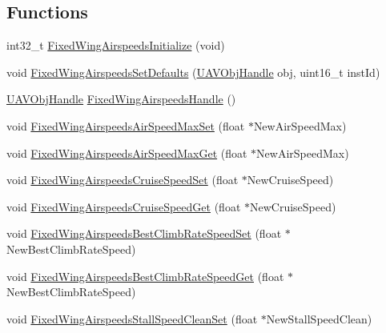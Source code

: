 \subsection*{\-Functions}
\begin{DoxyCompactItemize}
\item 
int32\-\_\-t \hyperlink{group___fixed_wing_airspeeds_ga52672d71624bc82d500665e1c28888bb}{\-Fixed\-Wing\-Airspeeds\-Initialize} (void)
\item 
void \hyperlink{group___fixed_wing_airspeeds_ga77e7e8dc2a74b5e75975be48e8fd7d37}{\-Fixed\-Wing\-Airspeeds\-Set\-Defaults} (\hyperlink{targets_2_u_a_v_objects_2inc_2uavobjectmanager_8h_a279053e22be53ce9f895043aaeb91e3b}{\-U\-A\-V\-Obj\-Handle} obj, uint16\-\_\-t inst\-Id)
\item 
\hyperlink{targets_2_u_a_v_objects_2inc_2uavobjectmanager_8h_a279053e22be53ce9f895043aaeb91e3b}{\-U\-A\-V\-Obj\-Handle} \hyperlink{group___fixed_wing_airspeeds_ga403ed41148bf38f88ba034736e644007}{\-Fixed\-Wing\-Airspeeds\-Handle} ()
\item 
void \hyperlink{group___fixed_wing_airspeeds_gaa02eec62acc242b17e9f61711ce8a6d0}{\-Fixed\-Wing\-Airspeeds\-Air\-Speed\-Max\-Set} (float $\ast$\-New\-Air\-Speed\-Max)
\item 
void \hyperlink{group___fixed_wing_airspeeds_ga8389fb71d58505ed67c9ba867c17c679}{\-Fixed\-Wing\-Airspeeds\-Air\-Speed\-Max\-Get} (float $\ast$\-New\-Air\-Speed\-Max)
\item 
void \hyperlink{group___fixed_wing_airspeeds_ga4f71c7aae21aeadfc42454452559eff1}{\-Fixed\-Wing\-Airspeeds\-Cruise\-Speed\-Set} (float $\ast$\-New\-Cruise\-Speed)
\item 
void \hyperlink{group___fixed_wing_airspeeds_ga351a411511e8533a310b58d9da5bebc6}{\-Fixed\-Wing\-Airspeeds\-Cruise\-Speed\-Get} (float $\ast$\-New\-Cruise\-Speed)
\item 
void \hyperlink{group___fixed_wing_airspeeds_gac780b03f1dfb105da06eca57a06acb89}{\-Fixed\-Wing\-Airspeeds\-Best\-Climb\-Rate\-Speed\-Set} (float $\ast$\-New\-Best\-Climb\-Rate\-Speed)
\item 
void \hyperlink{group___fixed_wing_airspeeds_ga8f4063e7fa9e5fa8b52fd64e32b54ddb}{\-Fixed\-Wing\-Airspeeds\-Best\-Climb\-Rate\-Speed\-Get} (float $\ast$\-New\-Best\-Climb\-Rate\-Speed)
\item 
void \hyperlink{group___fixed_wing_airspeeds_ga5c3734fb73e609cc0d7421a0a11f3037}{\-Fixed\-Wing\-Airspeeds\-Stall\-Speed\-Clean\-Set} (float $\ast$\-New\-Stall\-Speed\-Clean)
\item 

\end{DoxyCompactItemize}
